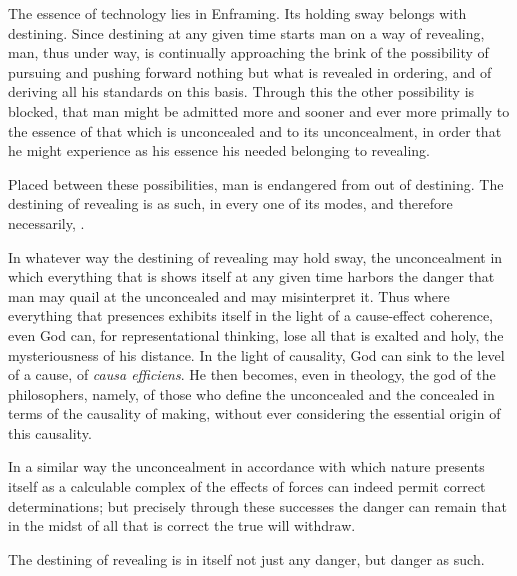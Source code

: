 The essence of technology lies in Enframing. Its holding sway belongs with destining. Since destining at any given time starts man on a way of revealing, man, thus under way, is continually approaching the brink of the possibility of pursuing and pushing forward nothing but what is revealed in ordering, and of deriving all his standards on this basis. Through this the other possibility is blocked, that man might be admitted more and sooner and ever more primally to the essence of that which is unconcealed and to its unconcealment, in order that he might experience as his essence his needed belonging to revealing.

Placed between these possibilities, man is endangered from out of destining. The destining of revealing is as such, in every one of its modes, and therefore necessarily, .

In whatever way the destining of revealing may hold sway, the unconcealment in which everything that is shows itself at any given time harbors the danger that man may quail at the unconcealed and may misinterpret it. Thus where everything that presences exhibits itself in the light of a cause-effect coherence, even God can, for representational thinking, lose all that is exalted and holy, the mysteriousness of his distance. In the light of causality, God can sink to the level of a cause, of \textit{causa efficiens}. He then becomes, even in theology, the god of the philosophers, namely, of those who define the unconcealed and the concealed in terms of the causality of making, without ever considering the essential origin of this causality.

In a similar way the unconcealment in accordance with which nature presents itself as a calculable complex of the effects of forces can indeed permit correct determinations; but precisely through these successes the danger can remain that in the midst of all that is correct the true will withdraw.

The destining of revealing is in itself not just any danger, but danger as such.

